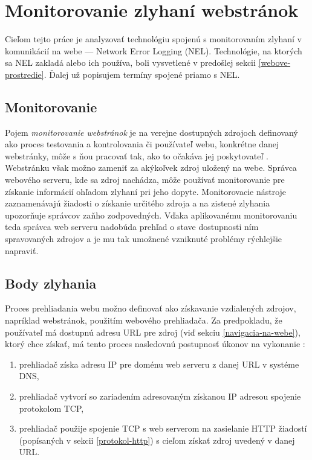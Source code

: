 \pagebreak


\section{Monitorovanie zlyhaní webstránok}

Cieľom tejto práce je analyzovať technológiu spojenú s monitorovaním zlyhaní v komunikácií 
na webe --- Network Error Logging (NEL).
Technológie, na ktorých sa NEL zakladá alebo ich používa, boli vysvetlené v predošlej sekcii \ref{webove-prostredie}.
Ďalej už popisujem termíny spojené priamo s NEL.

\subsection{Monitorovanie}
\label{monitorovanie}

Pojem \textit{monitorovanie webstránok} je na verejne dostupných zdrojoch definovaný ako proces testovania a kontrolovania či používateľ webu, konkrétne danej webstránky, môže s ňou pracovať tak, ako to očakáva jej poskytovateľ \cite{wiki-website-monitoring}. 
Webstránku však možno zameniť za akýkoľvek zdroj uložený na webe.
Správca webového serveru, kde sa zdroj nachádza, môže používať monitorovanie pre získanie informácií ohľadom zlyhaní pri jeho dopyte.
Monitorovacie nástroje zaznamenávajú žiadosti o získanie určitého zdroja a na zistené zlyhania upozorňuje správcov zaňho zodpovedných.  
Vďaka aplikovanému monitorovaniu teda správca web serveru nadobúda prehľad o stave dostupnosti ním spravovaných zdrojov a je mu tak umožnené vzniknuté problémy rýchlejšie napraviť.

\subsection{Body zlyhania}
\label{body-zlyhania}

Proces prehliadania webu možno definovať ako získavanie vzdialených zdrojov, napríklad webstránok, použitím webového prehliadača.
Za predpokladu, že používateľ má dostupnú adresu URL pre zdroj (viď sekciu \ref{navigacia-na-webe}), 
ktorý chce získať, má tento proces nasledovnú postupnosť úkonov na vykonanie \cite{nel-client-side-measurement-e2e-reliability, mdn-docs-how-browser-works}:

\begin{enumerate}
    \item prehliadač získa adresu IP pre doménu web serveru z danej URL v systéme DNS,
    
    \item prehliadač vytvorí so zariadením adresovaným získanou IP adresou spojenie protokolom TCP,
    
    \item prehliadač použije spojenie TCP s web serverom na zasielanie HTTP žiadostí 
    (popísaných v sekcii \ref{protokol-http}) s cieľom získať zdroj uvedený v danej URL.
\end{enumerate}

